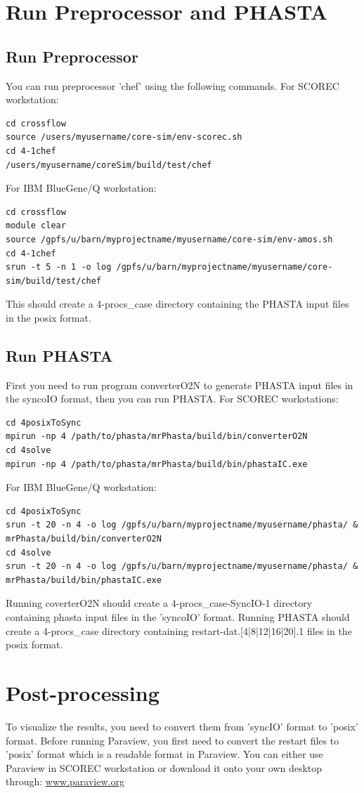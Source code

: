 \documentclass{article}
\begin{document}
\section{Run Preprocessor and PHASTA}
\label{ch:5}
\subsection{Run Preprocessor}
You can run preprocessor 'chef' using the following commands. For SCOREC workstation:
\begin{lstlisting}
cd crossflow
source /users/myusername/core-sim/env-scorec.sh
cd 4-1chef
/users/myusername/coreSim/build/test/chef 
\end{lstlisting}
For IBM BlueGene/Q workstation:
\begin{lstlisting}
cd crossflow
module clear
source /gpfs/u/barn/myprojectname/myusername/core-sim/env-amos.sh
cd 4-1chef
srun -t 5 -n 1 -o log /gpfs/u/barn/myprojectname/myusername/core-sim/build/test/chef
\end{lstlisting}

This should create a 4-procs\_case directory containing the PHASTA input files in the posix format.

\subsection{Run PHASTA}

First you need to run program converterO2N to generate PHASTA input files in the syncoIO format, then you can run PHASTA. For SCOREC workstations: 
\begin{lstlisting}
cd 4posixToSync
mpirun -np 4 /path/to/phasta/mrPhasta/build/bin/converterO2N 
cd 4solve
mpirun -np 4 /path/to/phasta/mrPhasta/build/bin/phastaIC.exe 
\end{lstlisting}
For IBM BlueGene/Q workstation:
\begin{lstlisting}
cd 4posixToSync
srun -t 20 -n 4 -o log /gpfs/u/barn/myprojectname/myusername/phasta/ & 
mrPhasta/build/bin/converterO2N
cd 4solve
srun -t 20 -n 4 -o log /gpfs/u/barn/myprojectname/myusername/phasta/ &
mrPhasta/build/bin/phastaIC.exe
\end{lstlisting}
Running coverterO2N should create a 4-procs\_case-SyncIO-1 directory containing phasta input files in the 'syncoIO' format.
Running PHASTA should create a 4-procs\_case directory containing restart-dat.[4|8|12|16|20].1 files in the posix format.

\section{Post-processing}
\label{ch:6}
To visualize the results, you need to convert them from 'syncIO' format to 'posix' format. Before running Paraview, you first need to convert the restart files to 'posix' format which is a readable format in Paraview. You can either use Paraview in SCOREC workstation or download it onto your own desktop through:
\url{www.paraview.org}
\end{document}
